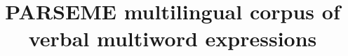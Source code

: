 \documentclass[output=paper,
modfonts,
]{langscibook}
\begin{document}



%
%
%

\title{PARSEME multilingual corpus of verbal multiword expressions} 

\end{document}

